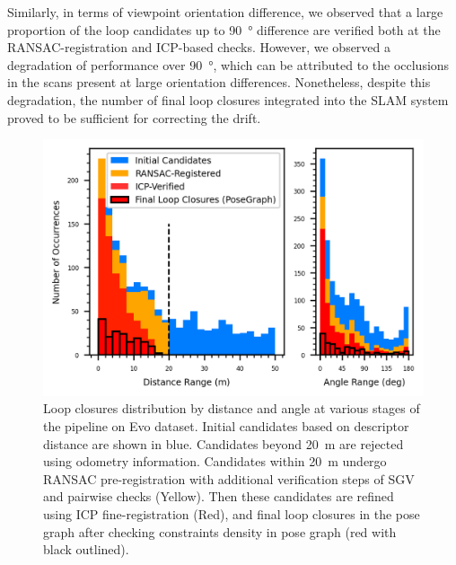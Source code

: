 Similarly, in terms of viewpoint orientation difference, we observed that a large proportion of the loop candidates up to \SI{90}{\degree} difference are verified both at the RANSAC-registration and ICP-based checks. However, we observed a degradation of performance over \SI{90}{\degree}, which can be attributed to the occlusions in the scans present at large orientation differences. Nonetheless, despite this degradation, the number of final loop closures integrated into the SLAM system proved to be sufficient for correcting the drift.   

\begin{figure}[htbp]
  \centering
  \includegraphics[width=0.85\columnwidth]{pics/exp_2_2_loop_closure_histograms}
  \caption{Loop closures distribution by distance and angle at various stages of the pipeline on Evo dataset.
   Initial candidates based on descriptor distance are shown in blue. Candidates beyond \SI{20}{\meter} are rejected using odometry information. Candidates within \SI{20}{\meter} undergo RANSAC pre-registration with additional verification steps of SGV\cite{vidanapathirana2023ral} and pairwise checks (Yellow). Then these candidates are refined using ICP fine-registration (Red), and final loop closures in the pose graph after checking constraints density in pose graph (red with black outlined).}
  \label{fig:exp_2_2_loop_closure_histograms}
\end{figure}



